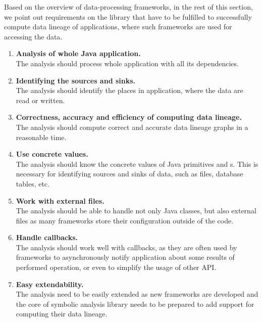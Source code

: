 Based on the overview of data-processing frameworks,
in the rest of this section, we point out requirements on the library that
have to be fulfilled to successfully compute data lineage of applications,
where such frameworks are used for accessing the data.

\begin{enumerate}
  \item \textbf{Analysis of whole Java application.} \\
    The analysis should process whole application with all its dependencies.
  \item \textbf{Identifying the sources and sinks.} \\
    The analysis should identify the places in application, where the data
    are read or written.
  \item \textbf{Correctness, accuracy and efficiency of computing data lineage.} \\
    The analysis should compute correct and accurate data lineage graphs in a reasonable time.
  \item \textbf{Use concrete values.} \\
    The analysis should know the concrete values of Java primitives and s.
    This is necessary for identifying sources and sinks of data,
    such as files, database tables, etc.
  \item \textbf{Work with external files.} \\
    The analysis should be able to handle not only Java classes,
    but also external files as many frameworks store their configuration
    outside of the code.
  \item \textbf{Handle callbacks.} \\
    The analysis should work well with callbacks, as they are often
    used by frameworks to asynchronously notify application
    about some results of performed operation, or even
    to simplify the usage of other API.
  \item \textbf{Easy extendability.} \\
    The analysis need to be easily extended as new frameworks are developed
    and the core of symbolic analysis library needs to be prepared to add support for computing their data lineage.
\end{enumerate}



